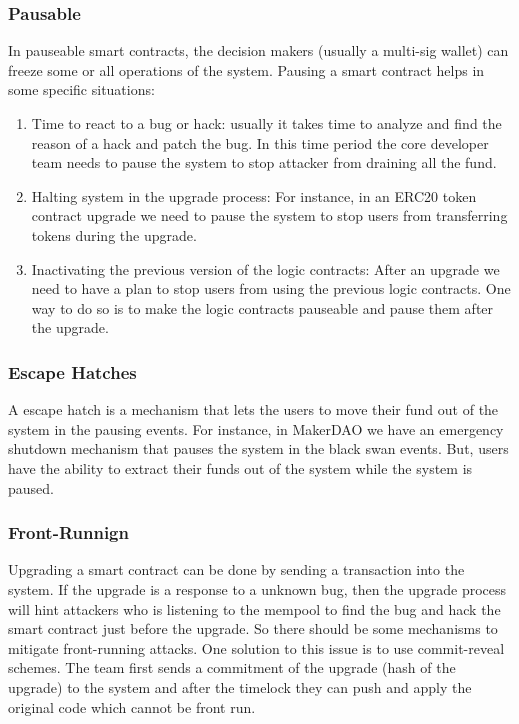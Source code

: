 \subsubsection{Pausable}
In pauseable smart contracts, the decision makers (usually a multi-sig wallet) can freeze some or all operations of the system. Pausing a smart contract helps in some specific situations:

\begin{enumerate}
  \item Time to react to a bug or hack: usually it takes time to analyze and find the reason of a hack and patch the bug. In this time period the core developer team needs to pause the system to stop attacker from draining all the fund.
  \item Halting system in the upgrade process: For instance, in an ERC20 token contract upgrade we need to pause the system to stop users from transferring tokens during the upgrade. 
  \item Inactivating the previous version of the logic contracts: After an upgrade we need to have a plan to stop users from using the previous logic contracts. One way to do so is to make the logic contracts pauseable and pause them after the upgrade. 
\end{enumerate}

\subsubsection{Escape Hatches}
A escape hatch is a mechanism that lets the users to move their fund out of the system in the pausing events. For instance, in MakerDAO we have an emergency shutdown mechanism that pauses the system in the black swan events. But, users have the ability to extract their funds out of the system while the system is paused.
\subsubsection{Front-Runnign}
Upgrading a smart contract can be done by sending a transaction into the system. If the upgrade is a response to a unknown bug, then the upgrade process will hint attackers who is listening to the mempool to find the bug and hack the smart contract just before the upgrade. So there should be some mechanisms to mitigate front-running attacks. One solution to this issue is to use commit-reveal schemes. The team first sends a commitment of the upgrade (hash of the upgrade) to the system and after the timelock they can push and apply the original code which cannot be front run. 



